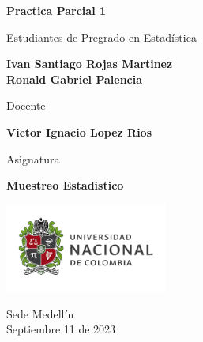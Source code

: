 \begin{titlepage}
   \Large{
   \begin{center}
       \vspace*{1cm}

       \textbf{Practica Parcial 1}
       
       \vspace{1.5cm}
        
      
       Estudiantes de Pregrado en Estadística
       
       \vspace{1cm}
         
       
       \textbf{Ivan Santiago Rojas Martinez} \\
       \textbf{Ronald Gabriel Palencia}
        
       \vspace{1cm}
       
      
       Docente
       
       \vspace{0.5cm}

       \textbf{Victor Ignacio Lopez Rios}
       
       \vspace{0.4cm}

       \vspace{1.5cm}
       
       Asignatura
       
       \vspace{0.5cm}

       \textbf{Muestreo Estadistico}

       \vfill

            
       \vspace{0.1cm}
     
       \includegraphics[width=0.4\textwidth]{DocumentFormat/logounal.png}
            
       Sede Medellín\\
       Septiembre 11 de 2023
       
   \end{center}
   }
\end{titlepage}

